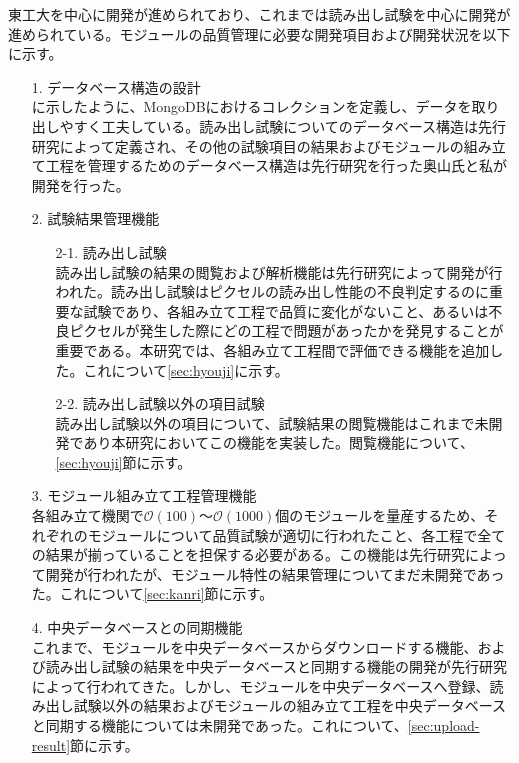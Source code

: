 東工大を中心に開発が進められており、これまでは読み出し試験を中心に開発が進められている。モジュールの品質管理に必要な開発項目および開発状況を以下に示す。
\begin{itemize}
  \item[1.] データベース構造の設計 \\
  に示したように、MongoDBにおけるコレクションを定義し、データを取り出しやすく工夫している。読み出し試験についてのデータベース構造は先行研究\cite{kubotan,kimu}によって定義され、その他の試験項目の結果およびモジュールの組み立て工程を管理するためのデータベース構造は先行研究\cite{oku}を行った奥山氏と私が開発を行った。
  \item[2.] 試験結果管理機能
  \begin{itemize}
    \item[2-1.] 読み出し試験 \\
    読み出し試験の結果の閲覧および解析機能は先行研究\cite{oku,kubotan}によって開発が行われた。読み出し試験はピクセルの読み出し性能の不良判定するのに重要な試験であり、各組み立て工程で品質に変化がないこと、あるいは不良ピクセルが発生した際にどの工程で問題があったかを発見することが重要である。本研究では、各組み立て工程間で評価できる機能を追加した。これについて\ref{sec:hyouji}に示す。
    \item[2-2.] 読み出し試験以外の項目試験 \\
    読み出し試験以外の項目について、試験結果の閲覧機能はこれまで未開発であり本研究においてこの機能を実装した。閲覧機能について、\ref{sec:hyouji}節に示す。
  \end{itemize}
  \item[3.] モジュール組み立て工程管理機能 \\
  各組み立て機関で$\mathcal{O}(100)$〜$\mathcal{O}(1000)$個のモジュールを量産するため、それぞれのモジュールについて品質試験が適切に行われたこと、各工程で全ての結果が揃っていることを担保する必要がある。この機能は先行研究\cite{oku}によって開発が行われたが、モジュール特性の結果管理についてまだ未開発であった。これについて\ref{sec:kanri}節に示す。
  \item[4.] 中央データベースとの同期機能 \\
  これまで、モジュールを中央データベースからダウンロードする機能、および読み出し試験の結果を中央データベースと同期する機能の開発が先行研究\cite{oku}によって行われてきた。しかし、モジュールを中央データベースへ登録、読み出し試験以外の結果およびモジュールの組み立て工程を中央データベースと同期する機能については未開発であった。これについて、\ref{sec:upload-result}節に示す。
\end{itemize}






\newpage
